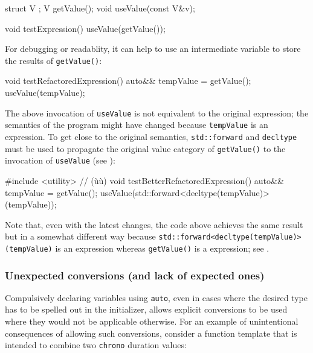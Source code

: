 \begin{emcppshiddenlisting}[emcppsbatch={e15,e15a,e16}]
struct V {};
V getValue();
void useValue(const V&v);
\end{emcppshiddenlisting}
\begin{emcppslisting}[emcppsbatch=e15]
void testExpression()
{
    useValue(getValue());
}
\end{emcppslisting}

For debugging or readablity, it can help to use an intermediate variable to
store the results of \lstinline!getValue()!:

\begin{emcppslisting}[emcppsbatch=e15a]
void testRefactoredExpression()
{
    auto&& tempValue = getValue();
    useValue(tempValue);
}
\end{emcppslisting}
    
\noindent The above invocation of \lstinline!useValue! is not equivalent to the
original expression; the semantics of the program might have changed because \lstinline!tempValue! is an  expression. To get
close to the original semantics, \lstinline!std::forward! and
\lstinline!decltype! must be used to propagate the original value category
of \lstinline!getValue()! to the invocation of \lstinline!useValue! (see
):

\begin{emcppslisting}[emcppsbatch=e16]
#include <utility>  // (ù{}ù)
void testBetterRefactoredExpression()
{
    auto&& tempValue = getValue();
    useValue(std::forward<decltype(tempValue)>(tempValue));
}
\end{emcppslisting}
    
\noindent Note that, even with the latest changes, the code above achieves the same result but in a somewhat different way because
 \lstinline!std::forward<decltype(tempValue)>(tempValue)! is
an  expression whereas \lstinline!getValue()! is a
 expression; see .

\subsubsection[Unexpected conversions (and lack of expected ones)]{Unexpected conversions (and lack of expected ones)}\label{unexpected-conversions-(and-lack-of-expected-ones)}

Compulsively declaring variables using \lstinline!auto!, even in cases
where the desired type has to be spelled out in the initializer, allows
explicit conversions to be used where they would not be applicable
otherwise. For an example of unintentional consequences of allowing such
conversions, consider a function template that is intended to combine
two \lstinline!chrono! duration values:

